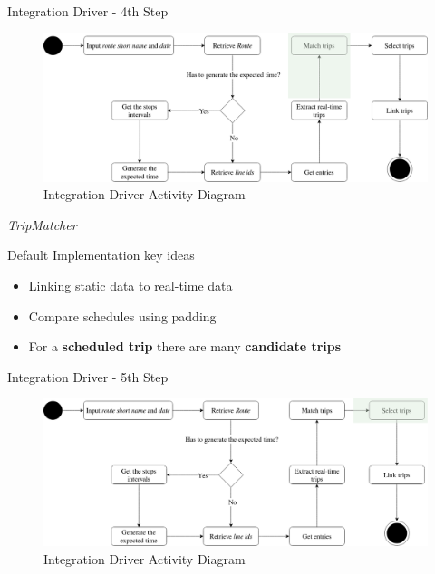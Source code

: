 \documentclass[xcolor=dvipsnames,table]{beamer}
\begin{document}
\begin{frame}{Integration Driver - 4th Step}
        \begin{figure}[H]
                \centering
                \includegraphics[width = \textwidth]{images/integrationDriverAD(4th_step).png}
                \caption{Integration Driver Activity Diagram}
        \end{figure}
\end{frame}
\begin{frame}{\textit{TripMatcher}}
        \begin{block}{Default Implementation key ideas}
                \begin{itemize}
                        \item Linking static data to real-time data
                        \item Compare schedules using padding
                        \item For a \textbf{scheduled trip} there are many \textbf{candidate trips}
                \end{itemize}
        \end{block}
\end{frame}

\begin{frame}{Integration Driver - 5th Step}
        \begin{figure}[H]
                \centering
                \includegraphics[width = \textwidth]{images/integrationDriverAD(5th_step).png}
                \caption{Integration Driver Activity Diagram}
        \end{figure}
\end{frame}
\end{document}
